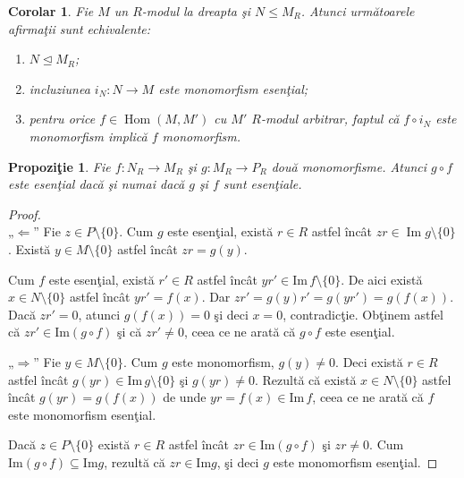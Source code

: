 \documentclass[12pt,a4paper]{book}
\DeclareMathOperator{\Hom}{Hom}
\newcommand{\ess}{\trianglelefteq}  %
\theoremstyle{plain}
\newtheorem{proposition}[theorem]{Propoziţie}
\newtheorem{corollary}[theorem]{Corolar}
\theoremstyle{definition}
\theoremstyle{remark}
\begin{document}
\begin{corollary}
Fie \(M\) un \(R\)-modul la dreapta şi \(N \leq M_R\).
Atunci următoarele afirmaţii sunt echivalente:
\begin{enumerate}
  \item \(N \ess M_R\);
  \item incluziunea \(i_N : N \to M\) este monomorfism esenţial;
  \item pentru orice \(f \in \Hom(M,M')\) cu \(M'\) \(R\)-modul arbitrar,
        faptul că \(f \circ i_N\) este monomorfism implică \(f\) monomorfism.
\end{enumerate}
\end{corollary}

\begin{proposition}
Fie \(f : N_R \to M_R\) şi \(g : M_R \to P_R\) două monomorfisme.
Atunci \(g \circ f\) este esenţial dacă şi numai dacă \(g\) şi \(f\) sunt
esenţiale.
\end{proposition}



\begin{proof}
\mbox{}\\[0.1em]
„\(\Leftarrow\)” Fie \(z \in P \setminus \{0\}\). Cum \(g\) este
esenţial, există \(r \in R\) astfel încât
\(zr \in \operatorname{Im} g \setminus \{0\}\). Există
\(y \in M \setminus \{0\}\) astfel încât \(zr = g(y)\).


Cum \(f\) este esenţial, există \(r' \in R\) astfel încât \(y r' \in \mathrm{Im}\, f \setminus \{0\}\).
De aici există \(x \in N \setminus \{0\}\) astfel încât \(y r' = f(x)\).
Dar \(zr' = g(y) r' = g(y r') = g(f(x))\). Dacă \(zr' = 0\), atunci \(g(f(x)) = 0\)
şi deci \(x = 0\), contradicţie. Obţinem astfel că \(zr' \in \mathrm{Im}(g \circ f)\)
şi că \(zr' \neq 0\), ceea ce ne arată că \(g \circ f\) este esenţial.

„\(\Rightarrow\)” Fie \(y \in M \setminus \{0\}\).
Cum \(g\) este monomorfism, \(g(y) \neq 0\).
Deci există \(r \in R\) astfel încât \(g(yr) \in \mathrm{Im}\, g \setminus \{0\}\)
şi \(g(yr) \neq 0\). Rezultă că există \(x \in N \setminus \{0\}\) astfel încât
\(g(yr) = g(f(x))\) de unde \(yr = f(x) \in \mathrm{Im}\, f\), ceea ce ne arată
că \(f\) este monomorfism esenţial.

Dacă \(z \in P \setminus \{0\}\) există \(r \in R\) astfel încât \(zr \in \mathrm{Im}(g \circ f)\)
şi \(zr \neq 0\). Cum \(\mathrm{Im}(g \circ f) \subseteq \mathrm{Im} g\),
rezultă că \(zr \in \mathrm{Im} g\), şi deci \(g\) este monomorfism esenţial.

\end{proof}
\end{document}
